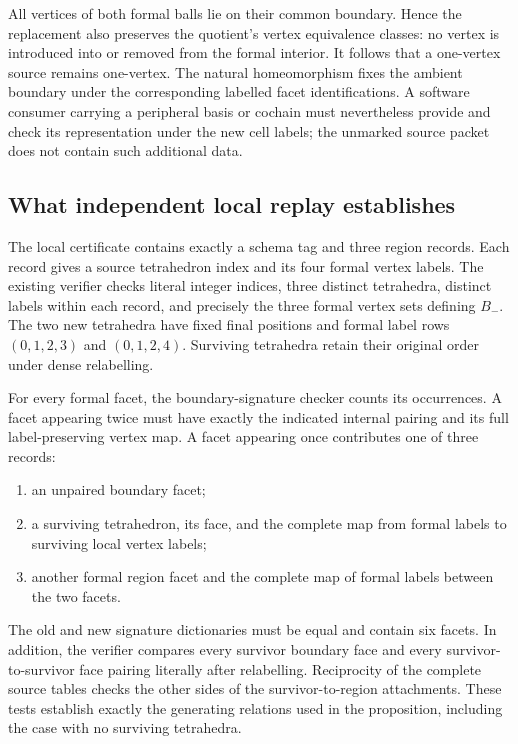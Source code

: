All vertices of both formal balls lie on their common boundary.  Hence
the replacement also preserves the quotient's vertex equivalence classes:
no vertex is introduced into or removed from the formal interior.
It follows that a one-vertex source remains one-vertex.  The natural
homeomorphism fixes the ambient boundary under the corresponding labelled
facet identifications.  A software consumer carrying a peripheral basis
or cochain must nevertheless provide and check its representation under
the new cell labels; the unmarked source packet does not contain
such additional data.

\subsection{What independent local replay establishes}

The local certificate  contains exactly a schema tag
and three region records.  Each record gives a source tetrahedron index
and its four formal vertex labels.  The existing verifier checks literal
integer indices, three distinct tetrahedra, distinct labels within each
record, and precisely the three formal vertex sets defining $B_-$.  The
two new tetrahedra have fixed final positions and formal label rows
$(0,1,2,3)$ and $(0,1,2,4)$.  Surviving tetrahedra retain their original
order under dense relabelling.

For every formal facet, the boundary-signature checker counts its
occurrences.  A facet appearing twice must have exactly the indicated
internal pairing and its full label-preserving vertex map.  A facet
appearing once contributes one of three records:
\begin{enumerate}
\item an unpaired boundary facet;
\item a surviving tetrahedron, its face, and the complete map from formal
      labels to surviving local vertex labels;
\item another formal region facet and the complete map of formal labels
      between the two facets.
\end{enumerate}
The old and new signature dictionaries must be equal and contain six
facets.  In addition, the verifier compares every survivor boundary face
and every survivor-to-survivor face pairing literally after relabelling.
Reciprocity of the complete source tables checks the other sides of the
survivor-to-region attachments.  These tests establish exactly the
generating relations used in the proposition, including the case with
no surviving tetrahedra.

